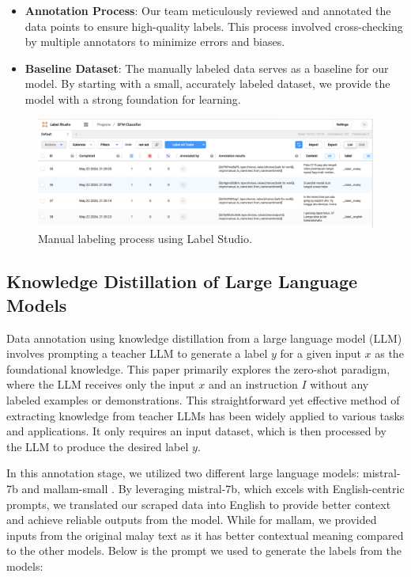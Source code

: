 \documentclass[preprint]{article}
\begin{document}
\begin{itemize}
    \item \textbf{Annotation Process}: Our team meticulously reviewed and annotated the data points to ensure high-quality labels. This process involved cross-checking by multiple annotators to minimize errors and biases.
    \item \textbf{Baseline Dataset}: The manually labeled data serves as a baseline for our model. By starting with a small, accurately labeled dataset, we provide the model with a strong foundation for learning.
\end{itemize}

\begin{figure}[h]
  \centering
  \includegraphics[width=0.6\linewidth]{img/labelstudio.png}
  \caption{Manual labeling process using Label Studio.}
\end{figure}

\subsection{Knowledge Distillation of Large Language Models}

Data annotation using knowledge distillation from a large language model (LLM) involves prompting a teacher LLM to generate a label \( y \) for a given input \( x \) as the foundational knowledge. This paper primarily explores the zero-shot paradigm, where the LLM receives only the input \( x \) and an instruction \( I \) without any labeled examples or demonstrations. This straightforward yet effective method of extracting knowledge from teacher LLMs has been widely applied to various tasks and applications. It only requires an input dataset, which is then processed by the LLM to produce the desired label \( y \).

In this annotation stage, we utilized two different large language models: mistral-7b and mallam-small \cite{zolkepli2024mallam}. By leveraging mistral-7b, which excels with English-centric prompts, we translated our scraped data into English to provide better context and achieve reliable outputs from the model. While for mallam, we provided inputs from the original malay text as it has better contextual meaning compared to the other models. Below is the prompt we used to generate the labels from the models:
\end{document}
